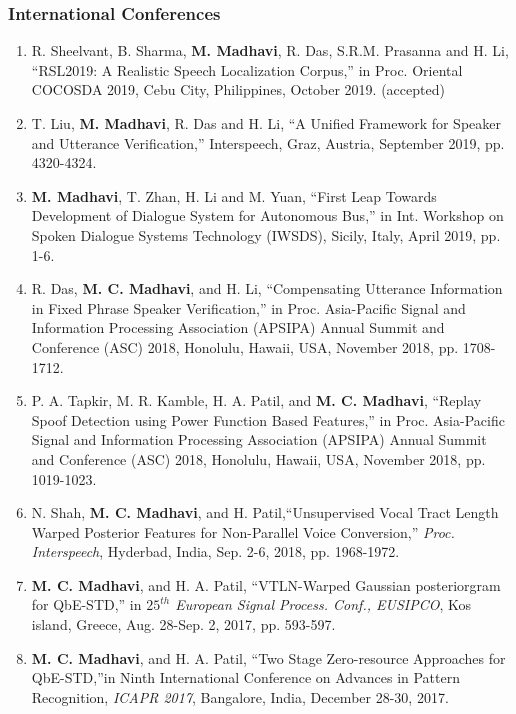 \documentclass[10pt]{article}
\begin{document}
\subsubsection*{International Conferences}
\begin{enumerate}[resume]
				\setlength\itemsep{-0.05em}
\item R. Sheelvant, B. Sharma, \textbf{M. Madhavi}, R. Das, S.R.M. Prasanna and H. Li, ``RSL2019: A Realistic Speech Localization Corpus,'' in Proc. Oriental COCOSDA 2019, Cebu City, Philippines, October 2019. (accepted)

\item T. Liu, \textbf{M. Madhavi}, R. Das and H. Li, ``A Unified Framework for Speaker and Utterance Verification,'' Interspeech, Graz, Austria, September 2019, pp. 4320-4324.

				
\item \textbf{M. Madhavi}, T. Zhan, H. Li and M. Yuan, ``First Leap Towards Development of Dialogue System for Autonomous Bus,'' in Int. Workshop on Spoken Dialogue Systems Technology (IWSDS),  Sicily, Italy, April 2019, pp. 1-6.

\item R. Das, \textbf{M. C. Madhavi}, and H. Li, ``Compensating Utterance Information in Fixed Phrase Speaker Verification,'' in Proc. Asia-Pacific Signal and Information Processing Association (APSIPA) Annual Summit and Conference (ASC) 2018, Honolulu, Hawaii, USA, November 2018, pp. 1708-1712.
				
\item P. A. Tapkir, M. R. Kamble, H. A. Patil, and  \textbf{M. C. Madhavi}, ``Replay Spoof Detection using Power Function Based Features,'' in Proc. Asia-Pacific Signal and Information Processing Association (APSIPA) Annual Summit and Conference (ASC) 2018, Honolulu, Hawaii, USA, November 2018, pp. 1019-1023.
				
\item N. Shah, \textbf{M. C. Madhavi}, and H. Patil,``Unsupervised Vocal Tract Length Warped Posterior Features for Non-Parallel Voice Conversion,'' \textit{Proc. Interspeech}, Hyderbad, India, Sep. 2-6, 2018, pp. 1968-1972.
				
\item  \textbf{M. C. Madhavi}, and H. A. Patil, ``VTLN-Warped Gaussian posteriorgram for QbE-STD,'' in \textit{$25^{th}$ European	Signal Process. Conf., EUSIPCO}, Kos island, Greece, Aug. 28-Sep. 2, 2017, pp. 593-597.

\item \textbf{M. C. Madhavi}, and H. A. Patil, ``Two Stage Zero-resource Approaches for QbE-STD,''in Ninth International Conference on Advances in Pattern Recognition, \textit{ICAPR 2017}, Bangalore, India, December 28-30, 2017.



\end{enumerate}
\end{document}
